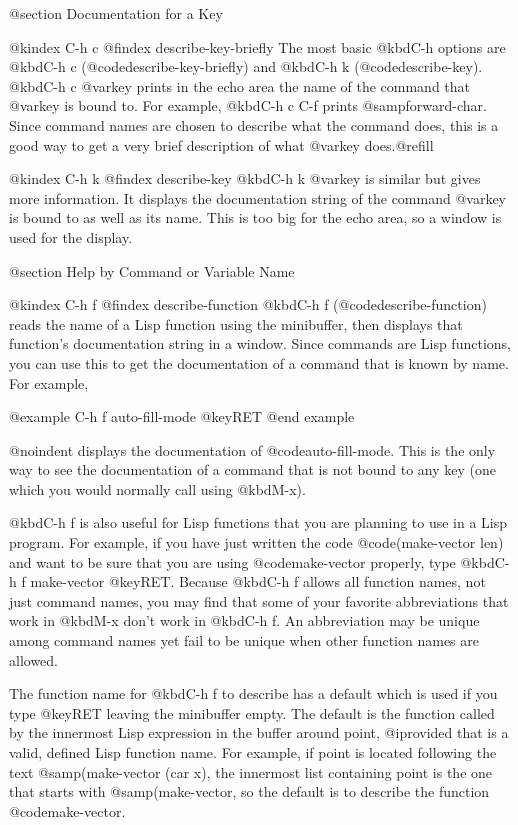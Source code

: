 {{{{{{@section Documentation for a Key

@kindex C-h c
@findex describe-key-briefly
  The most basic @kbd{C-h} options are @kbd{C-h c}
(@code{describe-key-briefly}) and @kbd{C-h k} (@code{describe-key}).
@kbd{C-h c @var{key}} prints in the echo area the name of the command that
@var{key} is bound to.  For example, @kbd{C-h c C-f} prints
@samp{forward-char}.  Since command names are chosen to describe what the
command does, this is a good way to get a very brief description of what
@var{key} does.@refill

@kindex C-h k
@findex describe-key
  @kbd{C-h k @var{key}} is similar but gives more information.  It displays
the documentation string of the command @var{key} is bound to as well as
its name.  This is too big for the echo area, so a window is used for the
display.

@section Help by Command or Variable Name

@kindex C-h f
@findex describe-function
  @kbd{C-h f} (@code{describe-function}) reads the name of a Lisp function
using the minibuffer, then displays that function's documentation string
in a window.  Since commands are Lisp functions, you can use this to get
the documentation of a command that is known by name.  For example,

@example
C-h f auto-fill-mode @key{RET}
@end example

@noindent
displays the documentation of @code{auto-fill-mode}.  This is the only
way to see the documentation of a command that is not bound to any key
(one which you would normally call using @kbd{M-x}).

  @kbd{C-h f} is also useful for Lisp functions that you are planning to
use in a Lisp program.  For example, if you have just written the code
@code{(make-vector len)} and want to be sure that you are using
@code{make-vector} properly, type @kbd{C-h f make-vector @key{RET}}.  Because
@kbd{C-h f} allows all function names, not just command names, you may find
that some of your favorite abbreviations that work in @kbd{M-x} don't work
in @kbd{C-h f}.  An abbreviation may be unique among command names yet fail
to be unique when other function names are allowed.

  The function name for @kbd{C-h f} to describe has a default which is
used if you type @key{RET} leaving the minibuffer empty.  The default is
the function called by the innermost Lisp expression in the buffer around
point, @i{provided} that is a valid, defined Lisp function name.  For
example, if point is located following the text @samp{(make-vector (car
x)}, the innermost list containing point is the one that starts with
@samp{(make-vector}, so the default is to describe the function
@code{make-vector}.

}}}}}}
